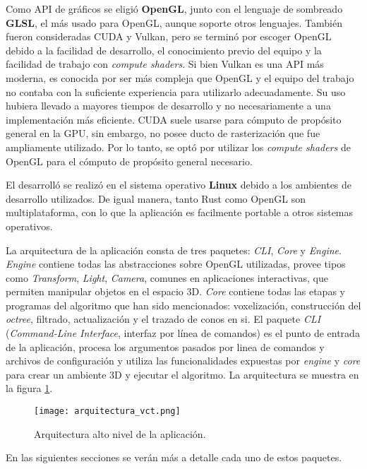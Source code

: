 Como API de gráficos se eligió \textbf{OpenGL}, junto con el lenguaje de sombreado \textbf{GLSL}, el más usado para OpenGL, aunque soporte otros lenguajes.
También fueron consideradas CUDA y Vulkan, pero se terminó por escoger OpenGL debido a la facilidad de desarrollo, el conocimiento previo del equipo y la facilidad de trabajo con \textit{compute shaders}.
Si bien Vulkan es una API más moderna, es conocida por ser más compleja que OpenGL y el equipo del trabajo no contaba con la suficiente experiencia para utilizarlo adecuadamente.
Su uso hubiera llevado a mayores tiempos de desarrollo y no necesariamente a una implementación más eficiente.
CUDA suele usarse para cómputo de propósito general en la GPU, sin embargo, no posee ducto de rasterización que fue ampliamente utilizado.
Por lo tanto, se optó por utilizar los \textit{compute shaders} de OpenGL para el cómputo de propósito general necesario.

El desarrolló se realizó en el sistema operativo \textbf{Linux} debido a los ambientes de desarrollo utilizados.
De igual manera, tanto Rust como OpenGL son multiplataforma, con lo que la aplicación es facilmente portable a otros sistemas operativos.

La arquitectura de la aplicación consta de tres paquetes: \textit{CLI}, \textit{Core} y \textit{Engine}.
\textit{Engine} contiene todas las abstracciones sobre OpenGL utilizadas, provee tipos como \textit{Transform}, \textit{Light}, \textit{Camera}, comunes en aplicaciones interactivas, que permiten manipular objetos en el espacio 3D.
\textit{Core} contiene todas las etapas y programas del algoritmo que han sido mencionados: voxelización, construcción del \textit{octree}, filtrado, actualización y el trazado de conos en si.
El paquete \textit{CLI} (\textit{Command-Line Interface}, interfaz por línea de comandos) es el punto de entrada de la aplicación, procesa los argumentos pasados por linea de comandos y archivos de configuración y utiliza las funcionalidades expuestas por \textit{engine} y \textit{core} para crear un ambiente 3D y ejecutar el algoritmo.
La arquitectura se muestra en la figura \ref{fig:overall_architecture}.

\begin{figure}
    \centering
    \texttt{[image: arquitectura\_vct.png]}
    \caption{Arquitectura alto nivel de la aplicación.}
    \label{fig:overall_architecture}
\end{figure}

En las siguientes secciones se verán más a detalle cada uno de estos paquetes.

